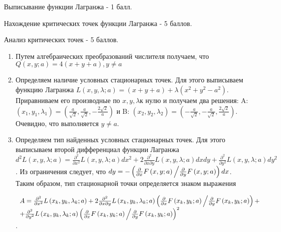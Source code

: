 \documentclass[pdftex,12pt,a4paper]{article}
\begin{document}
\begin{enumerate}
Выписывание функции Лагранжа - 1 балл.

Нахождение критических точек функции Лагранжа - 5 баллов.

Анализ критических точек - 5 баллов.


\begin{enumerate}
\item  Путем алгебраических преобразований числителя получаем, что $Q\left(x,y;a\right)=4\left(x+y+a\right),y\ne a$

\item  Определяем наличие условных стационарных точек. Для этого выписываем функцию Лагранжа $L\left(x,y,\lambda ;a\right)=\left(x+y+a\right)+\lambda \left(x^{2} +y^{2} -a^{2} \right)$. Приравниваем его производные по $x,y,\lambda $к нулю и получаем два решения: A: $\left(x_{1} ,y_{1} ,\lambda _{1} \right)=\left(\frac{a}{\sqrt{2} } ,\frac{a}{\sqrt{2} } ,-\frac{2\sqrt{2} }{a} \right)$ и B: $\left(x_{2} ,y_{2} ,\lambda _{2} \right)=\left(-\frac{a}{\sqrt{2} } ,-\frac{a}{\sqrt{2} } ,\frac{2\sqrt{2} }{a} \right)$. Очевидно, что выполняется $y\ne a$.

\item  Определяем тип найденных условных стационарных точек. Для этого выписываем второй дифференциал функции Лагранжа $d^{2} L\left(x,y,\lambda ;a\right)=\frac{\partial ^{2} }{\partial x^{2} } L\left(x,y,\lambda ;a\right)dx^{2} +2\frac{\partial ^{2} }{\partial x\partial y} L\left(x,y,\lambda ;a\right)dxdy+\frac{\partial ^{2} }{\partial y^{2} } L\left(x,y,\lambda ;a\right)dy^{2} $. Из ограничения следует, что $dy=-\left({\frac{\partial }{\partial x} F\left(x,y;a\right) \mathord{\left/{\vphantom{\frac{\partial }{\partial x} F\left(x,y;a\right) \frac{\partial }{\partial y} F\left(x,y;a\right)}}\right.\kern-\nulldelimiterspace} \frac{\partial }{\partial y} F\left(x,y;a\right)} \right)dx$. Таким образом, тип стационарной точки определяется знаком выражения 

$\begin{array}{l} {A=\frac{\partial ^{2} }{\partial x^{2} } L\left(x_{k} ,y_{k} ,\lambda _{k} ;a\right)+2\frac{\partial ^{2} }{\partial x\partial y} L\left(x_{k} ,y_{k} ,\lambda _{k} ;a\right)\left({\frac{\partial }{\partial x} F\left(x_{k} ,y_{k} ;a\right) \mathord{\left/{\vphantom{\frac{\partial }{\partial x} F\left(x_{k} ,y_{k} ;a\right) \frac{\partial }{\partial y} F\left(x_{k} ,y_{k} ;a\right)}}\right.\kern-\nulldelimiterspace} \frac{\partial }{\partial y} F\left(x_{k} ,y_{k} ;a\right)} \right)+} \\ {+\frac{\partial ^{2} }{\partial y^{2} } L\left(x_{k} ,y_{k} ,\lambda _{k} ;a\right)\left({\frac{\partial }{\partial x} F\left(x_{k} ,y_{k} ;a\right) \mathord{\left/{\vphantom{\frac{\partial }{\partial x} F\left(x_{k} ,y_{k} ;a\right) \frac{\partial }{\partial y} F\left(x_{k} ,y_{k} ;a\right)}}\right.\kern-\nulldelimiterspace} \frac{\partial }{\partial y} F\left(x_{k} ,y_{k} ;a\right)} \right)^{2} } \end{array}$. 



\end{enumerate}
\end{enumerate}
\end{document}
